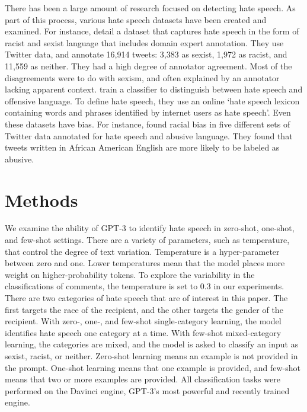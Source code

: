 \documentclass[12pt,]{article}
\begin{document}
There has been a large amount of research focused on detecting hate speech. As part of this process, various hate speech datasets have been created and examined. For instance, \citet{waseem2016hateful} detail a dataset that captures hate speech in the form of racist and sexist language that includes domain expert annotation. They use Twitter data, and annotate 16,914 tweets: 3,383 as sexist, 1,972 as racist, and 11,559 as neither. They had a high degree of annotator agreement. Most of the disagreements were to do with sexism, and often explained by an annotator lacking apparent context. \citet{davidson2017automated} train a classifier to distinguish between hate speech and offensive language. To define hate speech, they use an online `hate speech lexicon containing words and phrases identified by internet users as hate speech'. Even these datasets have bias. For instance, \citet{davidson2019racial} found racial bias in five different sets of Twitter data annotated for hate speech and abusive language. They found that tweets written in African American English are more likely to be labeled as abusive.

\hypertarget{methods}{%
\section{Methods}\label{methods}}

We examine the ability of GPT-3 to identify hate speech in zero-shot, one-shot, and few-shot settings. There are a variety of parameters, such as temperature, that control the degree of text variation. Temperature is a hyper-parameter between zero and one. Lower temperatures mean that the model places more weight on higher-probability tokens. To explore the variability in the classifications of comments, the temperature is set to 0.3 in our experiments. There are two categories of hate speech that are of interest in this paper. The first targets the race of the recipient, and the other targets the gender of the recipient. With zero-, one-, and few-shot single-category learning, the model identifies hate speech one category at a time. With few-shot mixed-category learning, the categories are mixed, and the model is asked to classify an input as sexist, racist, or neither. Zero-shot learning means an example is not provided in the prompt. One-shot learning means that one example is provided, and few-shot means that two or more examples are provided. All classification tasks were performed on the Davinci engine, GPT-3's most powerful and recently trained engine.
\end{document}
